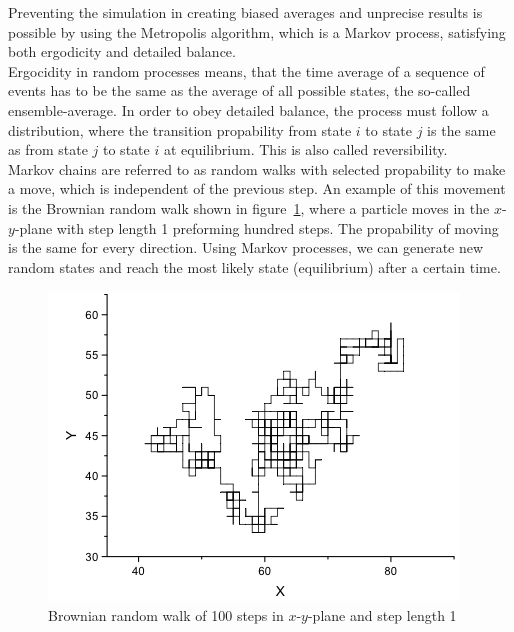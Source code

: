 Preventing the simulation in creating biased averages and unprecise results is possible by using the Metropolis algorithm, which is a Markov process, satisfying both ergodicity and detailed balance.\\
Ergocidity in random processes means, that the time average of a sequence of events has to be the same as the average of all possible states, the so-called ensemble-average. In order to obey detailed balance, the process must follow a distribution, where the transition propability from state $i$ to state $j$ is the same as from state $j$ to state $i$ at equilibrium. This is also called reversibility.\\
Markov chains are referred to as random walks with selected propability to make a move, which is independent of the previous step. An example of this movement is the Brownian random walk shown in figure~\ref{fig:Brown}, where a particle moves in the $x$-$y$-plane with step length 1 preforming hundred steps. The propability of moving is the same for every direction. Using Markov processes, we can generate new random states and reach the most likely state (equilibrium) after a certain time.
\begin{figure}[htbp]
    \centering
    \includegraphics[scale=0.6]{Brown}
    \caption{Brownian random walk of 100 steps in $x$-$y$-plane and step length 1}
    \label{fig:Brown}
\end{figure}
\FloatBarrier

